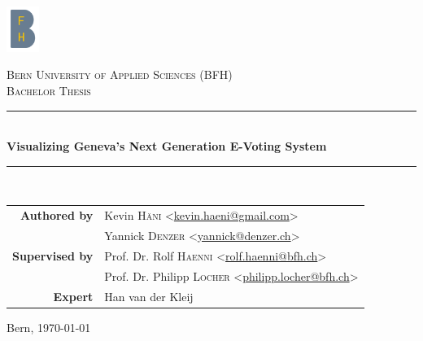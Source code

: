 \begin{titlepage}
\begin{center}
	\includegraphics[width=0.08\textwidth]{assets/bfh_logo.png}

	\vspace{1cm}

	\textsc{\Large Bern University of Applied Sciences (BFH)} \\[1.5cm]
	\textsc{\Large Bachelor Thesis} \\[1cm]

	\newcommand{\HRule}{\rule{\linewidth}{0.3mm}}
	\HRule \\[0.4cm]
	{\Large \bfseries Visualizing Geneva's Next Generation E-Voting System} \\
	\HRule \\[1.5cm]

	\begin{tabular}{rl}
	\textbf{Authored by}
	& Kevin \textsc{Häni} <\href{mailto:kevin.haeni@gmail.com}{kevin.haeni@gmail.com}> \\
	& Yannick \textsc{Denzer} <\href{mailto:yannick@denzer.ch}{yannick@denzer.ch}> \\
	\textbf{Supervised by}
	& Prof. Dr. Rolf \textsc{Haenni} <\href{mailto:rolf.haenni@bfh.ch}{rolf.haenni@bfh.ch}> \\
	& Prof. Dr. Philipp \textsc{Locher} <\href{mailto:philipp.locher@bfh.ch}{philipp.locher@bfh.ch}> \\
	\textbf{Expert}
	 & Han van der Kleij
	\end{tabular}

	\vfill

	Bern, {\large \today}
\end{center}
\end{titlepage}
